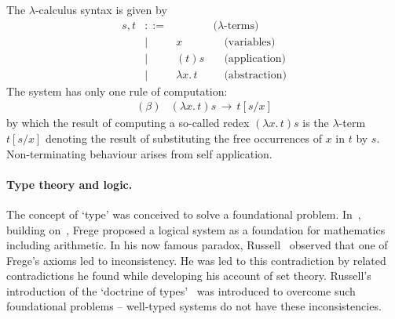 \documentclass[11pt,twocolumn]{article}
\newcommand{\lcalculus}{\mbox{$\lambda$-calculus}}
\begin{document}
The %
{\lcalculus} syntax is given by
  \[\begin{array}{rcll}
    s , t & ::= & & \mbox{($\lambda$-terms)}\\
      & \mid & x & \quad\mbox{(variables)}\\
      & \mid & (t)s & \quad\mbox{(application)}\\
      & \mid & \lambda x.\,t & \quad\mbox{(abstraction)}
  \end{array}\]
The system has only one rule of computation:
  \begin{equation}\label{BetaReduction}\begin{array}{rl}
(\beta) & (\lambda x.\,t)s \,\longrightarrow\, t[s/x]
  \end{array}\end{equation}
by which the result of computing a so-called redex $(\lambda x.\,t)s$ is
the \mbox{$\lambda$-term} $t[s/x]$ denoting the result of substituting the
free occurrences of $x$ in $t$ by $s$.  Non-terminating behaviour arises from
self application.

\paragraph{Type theory and logic.}
\label{SectionATypeTheoryAndLogicParagraph}

The concept of `type' was conceived to solve a foundational
problem.  In~\cite{Frege1903}, building on~\cite{Frege1879}, Frege proposed
a logical system as a foundation for mathematics including
arithmetic.  In his now famous paradox, Russell~\cite{Russell1902}
observed that one of Frege's axioms led to inconsistency.  He was led to
this contradiction by related contradictions he found while developing his account of set
theory.  Russell's introduction of the `doctrine of types'~\cite[Appendix~B]{Russell1903} 
was introduced to overcome such foundational problems -- well-typed systems do
not have these inconsistencies.
\end{document}
